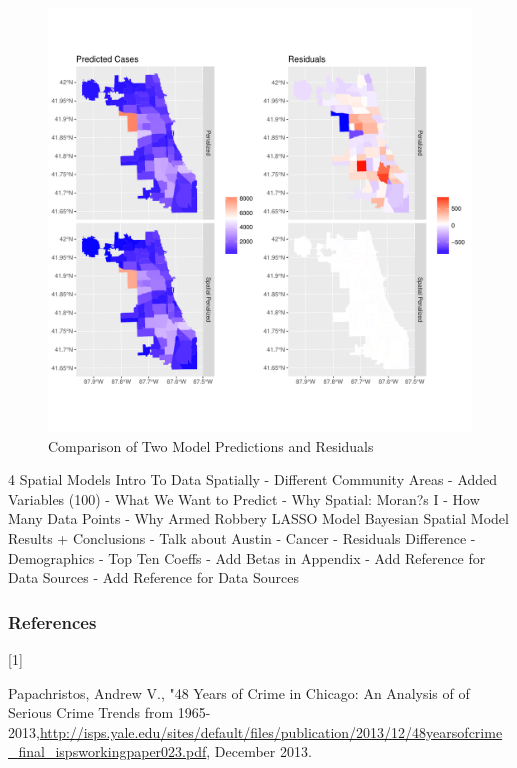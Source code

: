 \documentclass{article} %
\begin{document}
\begin{center}
\begin{figure}[ht]
\includegraphics[width = \textwidth]{Plots/results}
\caption{Comparison of Two Model Predictions and Residuals}
\label{fig:spatialplots}
\end{figure}
\end{center}

4 Spatial Models
Intro To Data Spatially - Different Community Areas - Added Variables (100) - What We Want to
Predict - Why Spatial: Moran?s I - How Many Data Points - Why Armed Robbery
LASSO Model
Bayesian Spatial Model
Results + Conclusions - Talk about Austin - Cancer - Residuals Difference - Demographics - Top
Ten Coeffs
- Add Betas in Appendix - Add Reference for Data Sources
- Add Reference for Data Sources 






\newpage


\subsubsection*{References}


\hypertarget{Ref1}{[1]} Papachristos, Andrew V., "48 Years of Crime in Chicago: An Analysis of of Serious Crime Trends from 1965-2013,\url{http://isps.yale.edu/sites/default/files/publication/2013/12/48yearsofcrime_final_ispsworkingpaper023.pdf}, December 2013.
\end{document}
